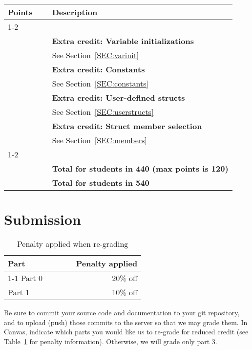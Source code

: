 \documentclass{article}
\makeatletter
\newcommand{\gradeline}{ \cline{1-2} \cline{4-4} ~\\[-1.5ex] }
\newenvironment{gradetable}{\begin{longtable}{@{}rrcp{5in}} \multicolumn{2}{l}{\bf Points} & & {\bf Description}\\ \gradeline}{\end{longtable}}
\newcommand{\mainitem}[2]{\pagebreak[2] {\bf #1} &&& {\bf #2}}
\newcommand{\innerpara}[1]{~ & ~ && #1}
\newcommand{\thispart}{3}
\makeatother
\begin{document}
\begin{gradetable}
  \mainitem{5}{Extra credit: Variable initializations}
  \\[1mm]
    \innerpara{See Section~\ref{SEC:varinit}}
  \\[4mm]

  \mainitem{5}{Extra credit: Constants}
  \\[1mm]
    \innerpara{See Section~\ref{SEC:constants}}
  \\[4mm]

  \mainitem{10}{Extra credit: User-defined structs}
  \\[1mm]
    \innerpara{See Section~\ref{SEC:userstructs}}
  \\[4mm]

  \mainitem{5}{Extra credit: Struct member selection}
  \\[1mm]
    \innerpara{See Section~\ref{SEC:members}}
  \\[4mm]

  \gradeline
  \mainitem{100}{Total for students in 440 (max points is 120)}
  \\
  \mainitem{115}{Total for students in 540}
\end{gradetable}


\section{Submission}

\begin{table}[h]
\centering

  \begin{tabular}{lcr}
    {\bf Part} & ~~~~ & {\bf Penalty applied} \\ \cline{1-1}\cline{3-3}
    Part 0 && 20\% off \\
    Part 1 && 10\% off
  \end{tabular}

\caption{Penalty applied when re-grading}
\label{TAB:penalties}
\end{table}

Be sure to commit your source code and documentation to your
git repository, and to upload (push) those commits to the server
so that we may grade them.
In Canvas,
indicate which parts you would like us to re-grade for reduced credit
(see Table~\ref{TAB:penalties} for penalty information).
Otherwise, we will grade only part \thispart.
\end{document}
